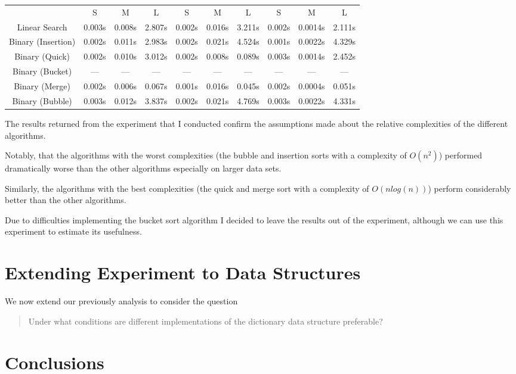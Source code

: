 \documentclass{article}
\begin{document}
\begin{center}
\begin{tabular}{ c c c c c c c c c c }
  & S & M & L & S & M & L & S & M & L \\ 
 Linear Search      & 0.003s & 0.008s & 2.807s & 0.002s & 0.016s & 3.211s & 0.002s & 0.0014s & 2.111s \\  
 Binary (Insertion) & 0.002s & 0.011s & 2.983s & 0.002s & 0.021s & 4.524s & 0.001s & 0.0022s & 4.329s \\ 
 Binary (Quick)     & 0.002s & 0.010s & 3.012s & 0.002s & 0.008s & 0.089s & 0.003s & 0.0014s & 2.452s \\
 Binary (Bucket)    & --- & --- & --- & --- & --- & --- & --- & --- & --- \\
 Binary (Merge)     & 0.002s & 0.006s & 0.067s & 0.001s & 0.016s & 0.045s & 0.002s & 0.0004s & 0.051s \\
 Binary (Bubble)    & 0.003s & 0.012s & 3.837s & 0.002s & 0.021s & 4.769s & 0.003s & 0.0022s & 4.331s \\
\end{tabular}
\end{center}

The results returned from the experiment that I conducted confirm the assumptions made about the relative complexities of the different algorithms.

Notably, that the algorithms with the worst complexities (the bubble and insertion sorts with a complexity of \begin{math}O(n^2)\end{math}) performed dramatically worse than the other algorithms especially on larger data sets. 

Similarly, the algorithms with the best complexities (the quick and merge sort with a complexity of \begin{math}O(nlog(n))\end{math}) perform considerably better than the other algorithms. 

Due to difficulties implementing the bucket sort algorithm I decided to leave the results out of the experiment, although we can use this experiment to estimate its usefulness.   





\section{Extending Experiment to Data Structures}
\label{sec:part3}

We now extend our previously analysis to consider the question
\begin{quote}
Under what conditions are different implementations of the dictionary data structure preferable?
\end{quote}

\section{Conclusions}
\label{sec:conclusions}
\end{document}

